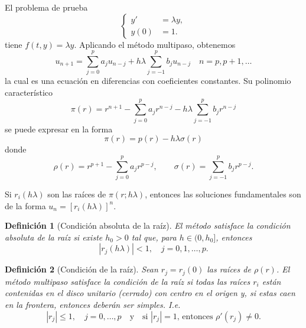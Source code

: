 \documentclass[11pt,letterpaper]{article}
\newtheorem{definition}{Definición}
\begin{document}
El problema de prueba
\begin{equation}
  \left\{
    \begin{aligned}
      y' &= \lambda y, \\
      y(0) &= 1.
    \end{aligned}
  \right.
\end{equation}
tiene $f(t,y)=\lambda y$. Aplicando el método multipaso, obtenemos
\begin{equation}
  u_{n+1}
  =
  \sum_{j=0}^{p}a_ju_{n-j}
  +
  h\lambda
  \sum_{j=-1}^{p}b_ju_{n-j}
  \quad
  n=p, p+1,\dots
\end{equation}
la cual es una ecuación en diferencias con coeficientes constantes.
Su polinomio característico
\begin{equation}
  \pi(r)
  = 
  r^{n+1}
  -
  \sum_{j=0}^{p}a_jr^{n-j}
  -
  h\lambda
  \sum_{j=-1}^{p}b_jr^{n-j}
\end{equation}
se puede expresar en la forma
\begin{equation}
  \pi(r) = p(r) - h\lambda\sigma(r)
\end{equation}
donde
\begin{equation}
  \rho(r)
  =
  r^{p+1}
  -
  \sum_{j=0}^{p}a_jr^{p-j},
  \qquad
  \sigma(r)
  =
  \sum_{j=-1}^{p}b_jr^{p-j}
.\end{equation}

Si $r_i(h\lambda)$ son las raíces de $\pi(r;h\lambda)$, entonces las
soluciones fundamentales son de la forma $u_n = [r_i(h\lambda)]^n$.

\begin{definition}[Condición absoluta de la raíz]
  El método satisface la \emph{condición absoluta de la raíz} si
  existe $h_0>0$ tal que, para $h\in (0,h_0]$, entonces
  \begin{equation}
    |r_j(h\lambda)|<1, \quad j=0,1,\dots,p
  .\end{equation}
\end{definition}

\begin{definition}[Condición de la raíz]
  Sean $r_j=r_j(0)$ las raíces de $\rho(r)$.
  El método multipaso satisface la \emph{condición de la raíz} si
  todas las
  raíces $r_i$ están contenidas en el disco unitario (cerrado) con
  centro en el origen y, si estas caen en la frontera, entonces
  deberán ser simples. I.e.
  \begin{equation}
    |r_j|\leq 1, \quad j=0,\dots,p
    \quad \text{y} \quad
    \text{si $|r_j|=1$, entonces } \rho'(r_j)\neq 0
  .\end{equation}
\end{definition}
\end{document}

